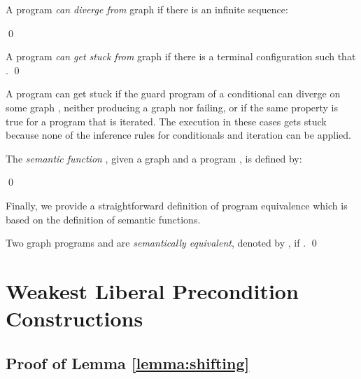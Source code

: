 \documentclass{llncs}
\begin{document}
	\begin{definition}[Divergence]\rm
		A program  \emph{can diverge from} graph  if there is an infinite sequence:
		
		\qed
	\end{definition}

	\begin{definition}\rm
		A program  \emph{can get stuck from} graph  if there is a terminal configuration  such that .
		\qed
	\end{definition}

	A program can get stuck if the guard program  of a conditional can diverge on some graph , neither producing a graph nor failing, or if the same property is true for a program that is iterated. The execution in these cases gets stuck because none of the inference rules for conditionals and iteration can be applied.


	\begin{definition}\label{def:semantic_function}\rm
	The \emph{semantic function} , given a graph  and a program , is defined by:


	
	\noindent	\qed
	\end{definition}

	Finally, we provide a straightforward definition of program equivalence which is based on the definition of semantic functions.

	\begin{definition}\rm
		Two graph programs  and  are \emph{semantically equivalent}, denoted by , if .
		\qed
	\end{definition}
	
	
	











	
	
	\newpage\section{Weakest Liberal Precondition Constructions}
	
	\subsection{Proof of Lemma \ref{lemma:shifting}}\label{lemma:shifting:PROOF}
	
\end{document}
